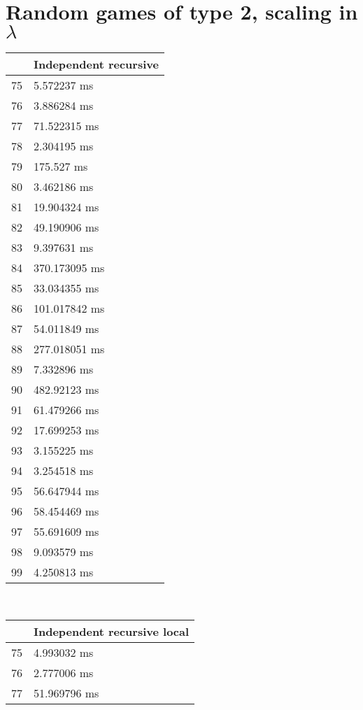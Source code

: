 \section{Random games of type 2, scaling in $\lambda$}
\begin{multicols}{2}
	\begin{tabular}{|l|l|}
		\hline
		& Independent recursive \\ \hline
		75 & 5.572237 ms \\ \hline
		76 & 3.886284 ms \\ \hline
		77 & 71.522315 ms \\ \hline
		78 & 2.304195 ms \\ \hline
		79 & 175.527 ms \\ \hline
		80 & 3.462186 ms \\ \hline
		81 & 19.904324 ms \\ \hline
		82 & 49.190906 ms \\ \hline
		83 & 9.397631 ms \\ \hline
		84 & 370.173095 ms \\ \hline
		85 & 33.034355 ms \\ \hline
		86 & 101.017842 ms \\ \hline
		87 & 54.011849 ms \\ \hline
		88 & 277.018051 ms \\ \hline
		89 & 7.332896 ms \\ \hline
		90 & 482.92123 ms \\ \hline
		91 & 61.479266 ms \\ \hline
		92 & 17.699253 ms \\ \hline
		93 & 3.155225 ms \\ \hline
		94 & 3.254518 ms \\ \hline
		95 & 56.647944 ms \\ \hline
		96 & 58.454469 ms \\ \hline
		97 & 55.691609 ms \\ \hline
		98 & 9.093579 ms \\ \hline
		99 & 4.250813 ms \\ \hline
	\end{tabular}\\
	\begin{tabular}{|l|l|}
		\hline
		& Independent recursive local \\ \hline
		75 & 4.993032 ms \\ \hline
		76 & 2.777006 ms \\ \hline
		77 & 51.969796 ms \\ \hline

\end{tabular}
\end{multicols}
